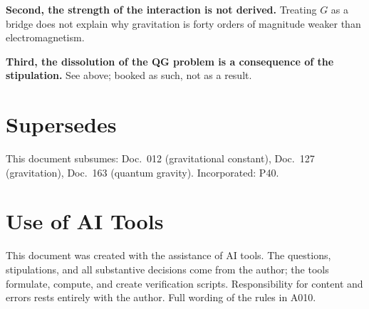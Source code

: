\textbf{Second, the strength of the interaction is not derived.} Treating $G$ as a
bridge does not explain why gravitation is forty orders of magnitude weaker than
electromagnetism.

\textbf{Third, the dissolution of the QG problem is a consequence of the
stipulation.} See above; booked as such, not as a result.

\section{Supersedes}

This document subsumes: Doc.~012 (gravitational constant), Doc.~127 (gravitation),
Doc.~163 (quantum gravity). Incorporated: P40.

\section{Use of AI Tools}

This document was created with the assistance of AI tools. The questions,
stipulations, and all substantive decisions come from the author; the tools
formulate, compute, and create verification scripts.
Responsibility for content and errors rests entirely with the author.
Full wording of the rules in A010.
